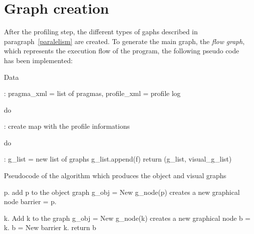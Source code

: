 \documentclass[a4paper,11pt,oneside]{book}
\begin{document}
\section{Graph creation}
\label{graph}

After the profiling step, the different types of gaphs described in paragraph~\ref{paralelism} are created. To generate the main graph, the \emph{flow graph}, which represents the execution flow of the program, the following pseudo code has been implemented:

\begin{algorithm}[H]
\begin{algorithmic}
\State \begin{bf}Data\end{bf}: pragma\_xml = list of pragmas, profile\_xml = profile log
\State \begin{bf}do\end{bf}: create map with the profile informations
\State \begin{bf}do\end{bf}: g\_list = new list of graphs
\State g\_list.append(f)  
\State {} 
\EndFor
\State return (g\_list, visual\_g\_list) 
\EndFunction
\end{algorithmic}
\caption{Pseudocode of the algorithm which produces the object and visual graphs}
\begin{algorithmic}
\State p.
\State add p to the object graph
\State g\_obj = New g\_node(p) \Comment creates a new graphical node
\State barrier = 
\State p.
\EndIf
\EndFor
\EndFunction
\end{algorithmic}

\begin{algorithmic}
\State k.
\State Add k to the graph
\State g\_obj = New g\_node(k) \Comment creates a new graphical node
\State b = 
\State k.
\Else 
\State b = New barrier
\State k.
\EndIf
\EndFor
\State return b
\EndFunction

\end{algorithmic}
\end{algorithm}
\end{document}
